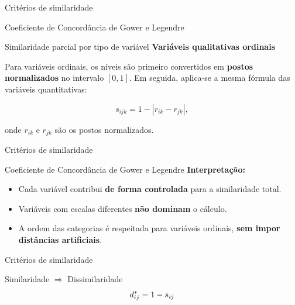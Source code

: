 \documentclass[
  ignorenonframetext,
  aspectratio=169,
]{beamer}
\providecommand{\tightlist}{%
  \setlength{\itemsep}{0pt}\setlength{\parskip}{0pt}}
\begin{document}
\begin{frame}{Critérios de similaridade}
\label{crituxe9rios-de-similaridade-11}
\begin{block}{Coeficiente de Concordância de Gower e Legendre}
\label{coeficiente-de-concorduxe2ncia-de-gower-e-legendre-5}
\begin{block}{Similaridade parcial por tipo de variável}
\label{similaridade-parcial-por-tipo-de-variuxe1vel-2}
\textbf{Variáveis qualitativas ordinais}

Para variáveis ordinais, os níveis são primeiro convertidos em
\textbf{postos normalizados} no intervalo \([0,1]\). Em seguida,
aplica-se a mesma fórmula das variáveis quantitativas:

\[
s_{ijk}
=
1 - |r_{ik} - r_{jk}|,
\]

onde \(r_{ik}\) e \(r_{jk}\) são os postos normalizados.
\end{block}
\end{block}
\end{frame}

\begin{frame}{Critérios de similaridade}
\label{crituxe9rios-de-similaridade-12}
\begin{block}{Coeficiente de Concordância de Gower e Legendre}
\label{coeficiente-de-concorduxe2ncia-de-gower-e-legendre-6}
\textbf{Interpretação:}

\begin{itemize}
\tightlist
\item
  Cada variável contribui \textbf{de forma controlada} para a
  similaridade total.
\item
  Variáveis com escalas diferentes \textbf{não dominam} o cálculo.
\item
  A ordem das categorias é respeitada para variáveis ordinais,
  \textbf{sem impor distâncias artificiais}.
\end{itemize}
\end{block}
\end{frame}

\begin{frame}{Critérios de similaridade}
\label{crituxe9rios-de-similaridade-13}
\begin{block}{Similaridade \(\Longrightarrow\) Dissimilaridade}
\label{similaridade-longrightarrow-dissimilaridade}
\[\Large d_{ij}^* = 1 - s_{ij}\]
\end{block}
\end{frame}
\end{document}
